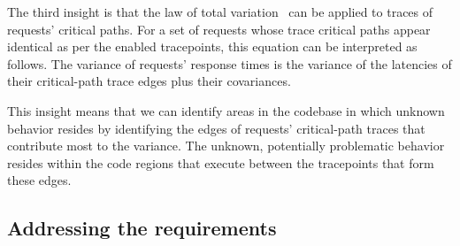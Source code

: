 

The third insight is that the law of total
variation~\cite{stats_textbook} can be applied to traces of requests'
critical paths.  For a set of requests whose trace critical paths
appear identical as per the enabled tracepoints, this equation can be
interpreted as follows.  The variance of requests' response times is
the variance of the latencies of their critical-path trace edges plus
their covariances.


This insight means that we can identify areas in the codebase in which
unknown behavior resides by identifying the edges of requests'
critical-path traces that contribute most to the variance.  The
unknown, potentially problematic behavior resides within the code
regions that execute between the tracepoints that form these edges.


\subsection{Addressing the requirements}
\label{sec:motivation:guiding_principles}

